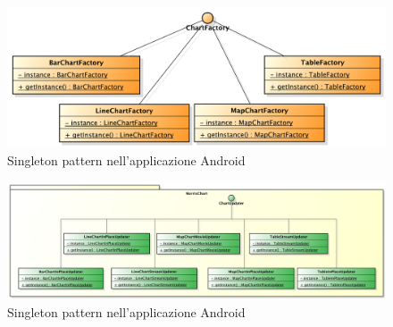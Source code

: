                     \begin{figure}[H]\centering
	        		\includegraphics[width=\textwidth]{SpecificaTecnica/Pics/DesignPatternNorris/Singleton2}
	        		\caption{Singleton pattern nell'applicazione Android}
	    		\end{figure}
	    		\begin{figure}[H]\centering
	        		\includegraphics[width=\textwidth]{SpecificaTecnica/Pics/DesignPatternNorris/Singleton1}
	        		\caption{Singleton pattern nell'applicazione Android}
	    		\end{figure}

